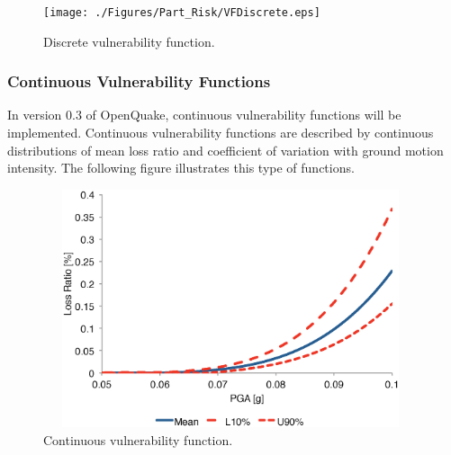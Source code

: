 \begin{figure}[ht]
\centering
\texttt{[image: ./Figures/Part\_Risk/VFDiscrete.eps]}
\caption{Discrete vulnerability function.}
\label{fig:VFDiscrete}
\end{figure}

\subsubsection{Continuous Vulnerability Functions}
In version 0.3 of OpenQuake, continuous vulnerability functions will be implemented. Continuous vulnerability functions are described by continuous distributions of mean loss ratio and coefficient of variation with ground motion intensity. The following figure illustrates this type of functions.

\begin{figure}[ht]
\centering
\includegraphics[width=11cm,height=7cm]{./Figures/Part_Risk/VFContinuous}
\caption{Continuous vulnerability function.}
\label{VFContinuous}
\end{figure}

